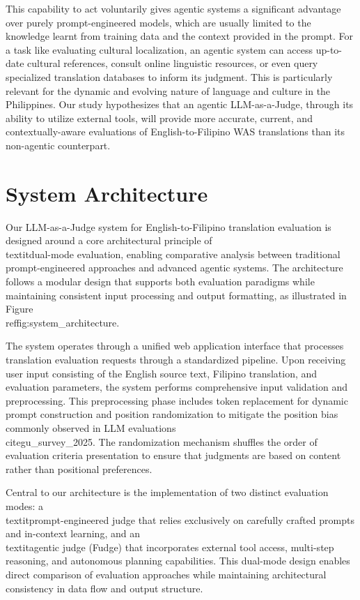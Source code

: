 \documentclass[conference]{IEEEtran}
\begin{document}
This capability to act voluntarily gives agentic systems a significant advantage over purely prompt-engineered models, which are usually limited to the knowledge learnt from training data and the context provided in the prompt. For a task like evaluating cultural localization, an agentic system can access up-to-date cultural references, consult online linguistic resources, or even query specialized translation databases to inform its judgment. This is particularly relevant for the dynamic and evolving nature of language and culture in the Philippines. Our study hypothesizes that an agentic LLM-as-a-Judge, through its ability to utilize external tools, will provide more accurate, current, and contextually-aware evaluations of English-to-Filipino WAS translations than its non-agentic counterpart.

\section{System Architecture}

Our LLM-as-a-Judge system for English-to-Filipino translation evaluation is designed around a core architectural principle of \\textit{dual-mode evaluation}, enabling comparative analysis between traditional prompt-engineered approaches and advanced agentic systems. The architecture follows a modular design that supports both evaluation paradigms while maintaining consistent input processing and output formatting, as illustrated in Figure~\\ref{fig:system_architecture}.

The system operates through a unified web application interface that processes translation evaluation requests through a standardized pipeline. Upon receiving user input consisting of the English source text, Filipino translation, and evaluation parameters, the system performs comprehensive input validation and preprocessing. This preprocessing phase includes token replacement for dynamic prompt construction and position randomization to mitigate the position bias commonly observed in LLM evaluations \\cite{gu_survey_2025}. The randomization mechanism shuffles the order of evaluation criteria presentation to ensure that judgments are based on content rather than positional preferences.

Central to our architecture is the implementation of two distinct evaluation modes: a \\textit{prompt-engineered judge} that relies exclusively on carefully crafted prompts and in-context learning, and an \\textit{agentic judge} (Fudge) that incorporates external tool access, multi-step reasoning, and autonomous planning capabilities. This dual-mode design enables direct comparison of evaluation approaches while maintaining architectural consistency in data flow and output structure.
\end{document}
